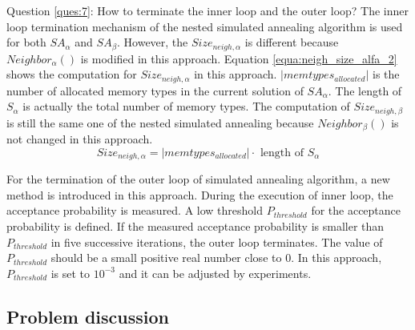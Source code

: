 		Question \ref{ques:7}: How to terminate the inner loop and the outer loop?
		The inner loop termination mechanism of the nested simulated annealing algorithm
		is used for both $SA_{\alpha}$ and $SA_{\beta}$.
		However, the $Size_{neigh,\alpha}$ is different because $Neighbor_{\alpha}()$
		is modified in this approach. Equation \ref{equa:neigh_size_alfa_2}
		shows the computation for $Size_{neigh,\alpha}$ in this approach.
		$\lvert memtypes_{allocated} \rvert$ is the number of allocated memory types in
		the current solution of $SA_{\alpha}$. The length of $S_{\alpha}$ is actually
		the total number of memory types. The computation of $Size_{neigh,\beta}$ is
		still the same one of the nested simulated annealing because $Neighbor_{\beta}()$
		is not changed in this approach.
		\begin{equation}
		\label{equa:neigh_size_alfa_2}
			Size_{neigh,\alpha}=\lvert memtypes_{allocated} \rvert \cdot \text{ length of } S_{\alpha}
		\end{equation}
		
		For the termination of the outer loop of simulated annealing algorithm,
		a new method is introduced in this approach. During the execution of inner loop,
		the acceptance probability is measured. A low threshold $P_{threshold}$ for the
		acceptance probability is defined. If the measured acceptance probability is
		smaller than $P_{threshold}$ in five successive iterations, the outer loop
		terminates. The value of $P_{threshold}$ should be a small positive real number
		close to 0. In this approach, $P_{threshold}$ is set to $10^{-3}$ and it
		can be adjusted by experiments.
		
		\subsection{Problem discussion}
		\label{subsec:problem_3}	
	
	
	